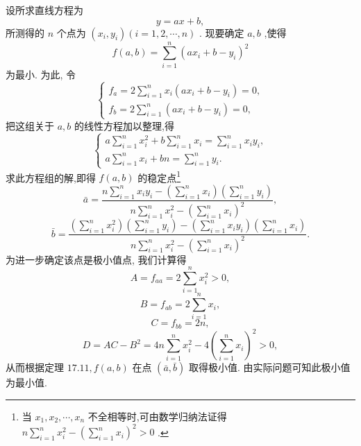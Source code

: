 \begin{solution}

\end{solution}
设所求直线方程为
\[
y = {ax} + b,
\]
所测得的 \(n\) 个点为 \(\left( {{x}_{i},{y}_{i}}\right) \left( {i = 1,2,\cdots ,n}\right)\) . 现要确定 \(a,b\) ,使得
\[
f\left( {a,b}\right)  = \mathop{\sum }\limits_{{i = 1}}^{n}{\left( a{x}_{i} + b - {y}_{i}\right) }^{2}
\]
为最小. 为此, 令
\[
\left\{  \begin{array}{l} {f}_{a} = 2\mathop{\sum }\limits_{{i = 1}}^{n}{x}_{i}\left( {a{x}_{i} + b - {y}_{i}}\right)  = 0, \\  {f}_{b} = 2\mathop{\sum }\limits_{{i = 1}}^{n}\left( {a{x}_{i} + b - {y}_{i}}\right)  = 0, \end{array}\right.
\]
把这组关于 \(a,b\) 的线性方程加以整理,得
\[
\left\{  \begin{array}{l} a\mathop{\sum }\limits_{{i = 1}}^{n}{x}_{i}^{2} + b\mathop{\sum }\limits_{{i = 1}}^{n}{x}_{i} = \mathop{\sum }\limits_{{i = 1}}^{n}{x}_{i}{y}_{i}, \\  a\mathop{\sum }\limits_{{i = 1}}^{n}{x}_{i} + {bn} = \mathop{\sum }\limits_{{i = 1}}^{n}{y}_{i}. \end{array}\right.
\]
求此方程组的解,即得 \(f\left( {a,b}\right)\) 的稳定点\footnote{当 \({x}_{1},{x}_{2},\cdots ,{x}_{n}\) 不全相等时,可由数学归纳法证得 \(n\mathop{\sum }\limits_{{i = 1}}^{n}{x}_{i}^{2} - {\left( \mathop{\sum }\limits_{{i = 1}}^{n}{x}_{i}\right) }^{2} > 0\) .}
\[
\bar{a} = \frac{n\mathop{\sum }\limits_{{i = 1}}^{n}{x}_{i}{y}_{i} - \left( {\mathop{\sum }\limits_{{i = 1}}^{n}{x}_{i}}\right) \left( {\mathop{\sum }\limits_{{i = 1}}^{n}{y}_{i}}\right) }{n\mathop{\sum }\limits_{{i = 1}}^{n}{x}_{i}^{2} - {\left( \mathop{\sum }\limits_{{i = 1}}^{n}{x}_{i}\right) }^{2}},
\]
\[
\bar{b} = \frac{\left( {\mathop{\sum }\limits_{{i = 1}}^{n}{x}_{i}^{2}}\right) \left( {\mathop{\sum }\limits_{{i = 1}}^{n}{y}_{i}}\right)  - \left( {\mathop{\sum }\limits_{{i = 1}}^{n}{x}_{i}{y}_{i}}\right) \left( {\mathop{\sum }\limits_{{i = 1}}^{n}{x}_{i}}\right) }{n\mathop{\sum }\limits_{{i = 1}}^{n}{x}_{i}^{2} - {\left( \mathop{\sum }\limits_{{i = 1}}^{n}{x}_{i}\right) }^{2}}.
\]
为进一步确定该点是极小值点, 我们计算得
\[
A = {f}_{aa} = 2\mathop{\sum }\limits_{{i = 1}}^{n}{x}_{i}^{2} > 0,
\]
\[
B = {f}_{ab} = 2\mathop{\sum }\limits_{{i = 1}}^{n}{x}_{i},
\]
\[
C = {f}_{bb} = {2n},
\]
\[
D = {AC} - {B}^{2} = {4n}\mathop{\sum }\limits_{{i = 1}}^{n}{x}_{i}^{2} - 4{\left( \mathop{\sum }\limits_{{i = 1}}^{n}{x}_{i}\right) }^{2} > 0,
\]
从而根据定理 \({17.11},f\left( {a,b}\right)\) 在点 \(\left( {\bar{a},\bar{b}}\right)\) 取得极小值. 由实际问题可知此极小值为最小值.

